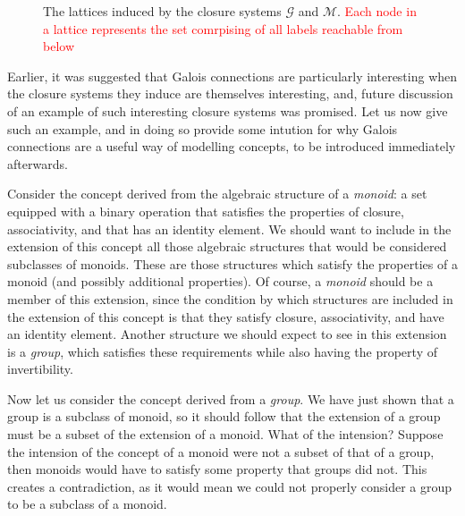 \begin{figure}[H]
  \vspace{-6em}
  \caption{The lattices induced by the closure systems $\mathcal{G}$ and $\mathcal{M}$. \textcolor{red}{Each node in a lattice represents
  the set comrpising of all labels reachable from below}}
  \label{figure:two-lattices}
\end{figure}

Earlier, it was suggested that Galois connections are particularly interesting when the closure systems they induce are themselves
interesting, and, future discussion of an example of such interesting closure systems was promised. Let us now give such an example, and in
doing so provide some intution for why Galois connections are a useful way of modelling concepts, to be introduced immediately afterwards.

Consider the concept derived from the algebraic structure of a \textit{monoid}: a set equipped with a binary operation that satisfies the properties
of closure, associativity, and that has an identity element. We should want to include in the extension of this concept all those algebraic
structures that would be considered subclasses of monoids. These are those structures which satisfy the properties of a monoid (and possibly
additional properties). Of course, a \textit{monoid} should be a member of this extension, since the condition by which structures are included
in the extension of this concept is that they satisfy closure, associativity, and have an identity element. Another structure we should
expect to see in this extension is a \textit{group}, which satisfies these requirements while also having the property of invertibility.

Now let us consider the concept derived from a \textit{group}. We have just shown that a group is a subclass of monoid, so it should follow that
the extension of a group must be a subset of the extension of a monoid. What of the intension? Suppose the intension of the concept of a monoid
were not a subset of that of a group, then monoids would have to satisfy some property that groups did not. This creates a contradiction, as
it would mean we could not properly consider a group to be a subclass of a monoid.

